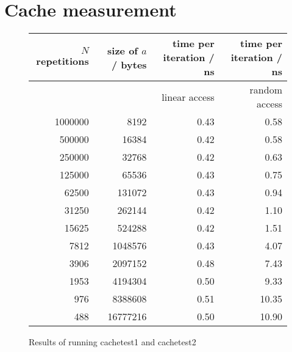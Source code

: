 \documentclass[10pt,a4paper,oneside]{article}
\begin{document}
    \section{Cache measurement}
    \begin{figure}[h!]
        \begin{mdframed}
            \begin{tabular}{|r|r|r|r|}
                \hline
                $N$ repetitions & size of $a$ / bytes& time per iteration / ns & time per iteration / ns \\ \hline
                & & linear access & random access \\ \hline
                \num[group-separator={,}]{    1000000    }    &    \num[group-separator={,}]{    8192    }    & 0.43 & 0.58    \\ \hline
                \num[group-separator={,}]{    500000    }    &    \num[group-separator={,}]{    16384    }    & 0.42 & 0.58    \\ \hline
                \num[group-separator={,}]{    250000    }    &    \num[group-separator={,}]{    32768    }    & 0.42 & 0.63    \\ \hline
                \num[group-separator={,}]{    125000    }    &    \num[group-separator={,}]{    65536    }    & 0.43 & 0.75    \\ \hline
                \num[group-separator={,}]{    62500    }    &    \num[group-separator={,}]{    131072    }    & 0.43 & 0.94    \\ \hline
                \num[group-separator={,}]{    31250    }    &    \num[group-separator={,}]{    262144    }    & 0.42 & 1.10    \\ \hline
                \num[group-separator={,}]{    15625    }    &    \num[group-separator={,}]{    524288    }    & 0.42 & 1.51    \\ \hline
                \num[group-separator={,}]{    7812    }    &    \num[group-separator={,}]{    1048576    }    & 0.43 & 4.07    \\ \hline
                \num[group-separator={,}]{    3906    }    &    \num[group-separator={,}]{    2097152    }    & 0.48 & 7.43    \\ \hline
                \num[group-separator={,}]{    1953    }    &    \num[group-separator={,}]{    4194304    }    & 0.50 & 9.33    \\ \hline
                \num[group-separator={,}]{    976    }    &    \num[group-separator={,}]{    8388608    }    & 0.51 & 10.35    \\ \hline
                \num[group-separator={,}]{    488    }    &    \num[group-separator={,}]{    16777216    }    & 0.50 & 10.90    \\ \hline
            \end{tabular}
        \end{mdframed}
        \caption{Results of running cachetest1 and cachetest2}
        \label{cacheresults}
    \end{figure}
\end{document}
